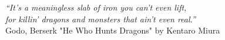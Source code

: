 \cleardoublepage
\thispagestyle{plain}

\vspace*{8cm}

\begin{flushright}
   \textsl{``It's a meaningless slab of iron you can't even lift, \\
           for killin' dragons and monsters that ain't even real.''} \\
\vspace*{1.5cm}
           Godo, Berserk "He Who Hunts Dragons" by Kentaro Miura
\end{flushright}

